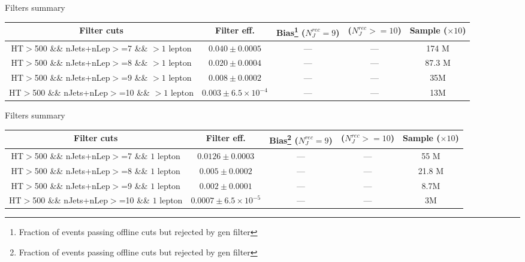 \documentclass{beamer}
\begin{document}
\begin{frame}{Filters summary}
\begin{center}
{\tiny \begin{tabular}{|c|c|c|c|c|}
\hline Filter cuts & Filter eff. & Bias\footnote{Fraction of events passing offline cuts but rejected by gen filter}  ($N_J^{rec}=9$)&  ($N_J^{rec}>=10$)&  Sample ($\times 10$) \\ 
\hline \thead{HT$>$500 \\ \&\& nJets+nLep$>$=7 \\ \&\& $>1$ lepton} & $0.040 \pm 0.0005$  & --- & --- & 174 M\\ 
\hline \thead{HT$>$500 \\ \&\& nJets+nLep$>$=8 \\ \&\& $>1$ lepton} & $0.020 \pm 0.0004$  & --- & --- & 87.3 M\\ 
\hline \thead{HT$>$500 \\ \&\& nJets+nLep$>$=9 \\ \&\& $>1$ lepton} & $0.008 \pm 0.0002$  & --- & --- & 35M\\ 
\hline \thead{HT$>$500 \\ \&\& nJets+nLep$>$=10 \\ \&\& $>1$ lepton} & $0.003 \pm 6.5\times 10^{-4}$  & --- & --- & 13M\\
\hline 
\end{tabular} }
\end{center}
\end{frame}

\begin{frame}{Filters summary}
\begin{center}
{\tiny \begin{tabular}{|c|c|c|c|c|}
\hline Filter cuts & Filter eff. & Bias\footnote{Fraction of events passing offline cuts but rejected by gen filter}  ($N_J^{rec}=9$)&  ($N_J^{rec}>=10$)&  Sample ($\times 10$) \\ 
\hline \thead{HT$>$500 \\ \&\& nJets+nLep$>$=7 \\ \&\& $1$ lepton} & $0.0126 \pm 0.0003$  & --- & --- & 55 M\\ 
\hline \thead{HT$>$500 \\ \&\& nJets+nLep$>$=8 \\ \&\& $1$ lepton} & $0.005 \pm 0.0002$  & --- & --- & 21.8 M\\ 
\hline \thead{HT$>$500 \\ \&\& nJets+nLep$>$=9 \\ \&\& $1$ lepton} & $0.002 \pm 0.0001$  & --- & --- & 8.7M\\ 
\hline \thead{HT$>$500 \\ \&\& nJets+nLep$>$=10 \\ \&\& $1$ lepton} & $0.0007 \pm 6.5\times 10^{-5}$  & --- & --- & 3M\\
\hline 
\end{tabular} }
\end{center}
\end{frame}
\end{document}
